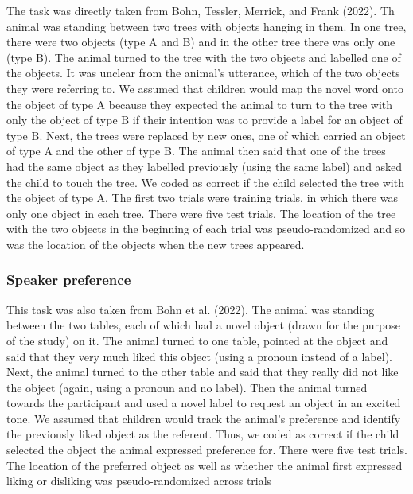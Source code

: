 \documentclass[
  english,
  man,floatsintext]{apa6}
\begin{document}
The task was directly taken from Bohn, Tessler, Merrick, and Frank (2022). Th animal was standing between two trees with objects hanging in them. In one tree, there were two objects (type A and B) and in the other tree there was only one (type B). The animal turned to the tree with the two objects and labelled one of the objects. It was unclear from the animal's utterance, which of the two objects they were referring to. We assumed that children would map the novel word onto the object of type A because they expected the animal to turn to the tree with only the object of type B if their intention was to provide a label for an object of type B. Next, the trees were replaced by new ones, one of which carried an object of type A and the other of type B. The animal then said that one of the trees had the same object as they labelled previously (using the same label) and asked the child to touch the tree. We coded as correct if the child selected the tree with the object of type A. The first two trials were training trials, in which there was only one object in each tree. There were five test trials. The location of the tree with the two objects in the beginning of each trial was pseudo-randomized and so was the location of the objects when the new trees appeared.

\hypertarget{speaker-preference}{%
\subsubsection{Speaker preference}\label{speaker-preference}}

This task was also taken from Bohn et al. (2022). The animal was standing between the two tables, each of which had a novel object (drawn for the purpose of the study) on it. The animal turned to one table, pointed at the object and said that they very much liked this object (using a pronoun instead of a label). Next, the animal turned to the other table and said that they really did not like the object (again, using a pronoun and no label). Then the animal turned towards the participant and used a novel label to request an object in an excited tone. We assumed that children would track the animal's preference and identify the previously liked object as the referent. Thus, we coded as correct if the child selected the object the animal expressed preference for. There were five test trials. The location of the preferred object as well as whether the animal first expressed liking or disliking was pseudo-randomized across trials
\end{document}
